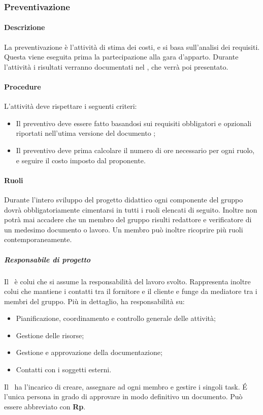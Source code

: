 \documentclass[../NormeDiProgetto_v3.0.0.tex]{subfiles}
\begin{document}
		\subsubsection{Preventivazione}
			\paragraph{Descrizione}
				La preventivazione è l'attività di stima dei costi, e si basa sull'analisi dei requisiti. Questa viene eseguita prima la partecipazione alla gara d'apparto.
				Durante l'attività i risultati verranno documentati nel \pianodiprogetto, che verrà poi presentato.
		
			\paragraph{Procedure}
				L'attività deve rispettare i seguenti criteri:
				\begin{itemize}
					\item Il preventivo deve essere fatto basandosi sui requisiti obbligatori e opzionali riportati nell'utima versione del documento \analisideirequisiti;
					\item Il preventivo deve prima calcolare il numero di ore necessario per ogni ruolo, e seguire il costo imposto dal proponente.
				\end{itemize}

			\paragraph{Ruoli}
			Durante l'intero sviluppo del progetto didattico ogni componente del gruppo dovrà obbligatoriamente cimentarsi in tutti i ruoli elencati di seguito.
			Inoltre non potrà mai accadere che un membro del gruppo risulti redattore e verificatore di un medesimo documento o lavoro.
			Un membro può inoltre ricoprire più ruoli contemporaneamente.
			
			\subparagraph{Responsabile di progetto}
			Il \responsabilediprogetto\ è colui che si assume la responsabilità del
			lavoro svolto. Rappresenta inoltre colui che mantiene i contatti tra il fornitore e il cliente e funge da mediatore tra i membri del gruppo. Più in dettaglio, ha responsabilità su:
			\begin{itemize}
			\item Pianificazione, coordinamento e controllo generale delle attività;
			\item Gestione delle risorse;
			\item Gestione e approvazione della documentazione;
			\item Contatti con i soggetti esterni.
			\end{itemize}
			Il \responsabilediprogetto\ ha l'incarico di creare, assegnare ad ogni membro e gestire i singoli task. É l'unica persona in grado di approvare in modo definitivo un documento.
			Può essere abbreviato con \textbf{Rp}.
			
\end{document}
